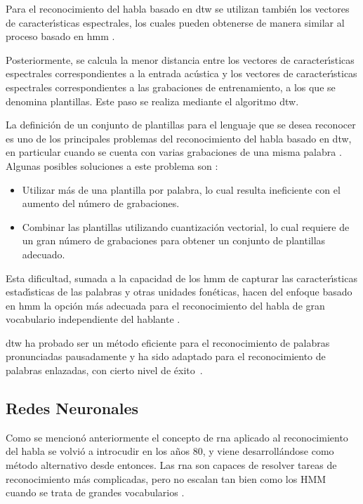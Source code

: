 Para el reconocimiento del habla basado en \gls{dtw} se utilizan tambi\'en los vectores de 
caracter{\'\i}sticas espectrales, los cuales pueden obtenerse de manera similar al proceso 
basado en \gls{hmm} \cite{Hachkar2011}.

Posteriormente, se calcula la menor distancia entre los vectores de caracter{\'\i}sticas 
espectrales correspondientes a la entrada ac\'ustica y los vectores de caracter{\'\i}sticas 
espectrales correspondientes a las grabaciones de entrenamiento, a los que se denomina plantillas. 
Este paso se realiza mediante el algoritmo \gls{dtw}.

La definici\'on de un conjunto de plantillas para el lenguaje que se desea reconocer es uno de
los principales problemas del reconocimiento del habla basado en \gls{dtw}, en particular cuando 
se cuenta con varias grabaciones de una misma palabra \cite{Abdulla2003}. 
Algunas posibles soluciones a este problema son \cite{Abdulla2003}:

\begin{itemize}
    \item Utilizar m\'as de una plantilla por palabra, lo cual resulta ineficiente con el aumento del
    n\'umero de grabaciones.
    \item Combinar las plantillas utilizando cuantizaci\'on vectorial, lo cual requiere de un gran
    n\'umero de grabaciones para obtener un conjunto de plantillas adecuado.
\end{itemize}

Esta dificultad, sumada a la capacidad de los \gls{hmm} de capturar las caracter{\'\i}sticas 
estad{\'\i}sticas de las palabras y otras unidades fon\'eticas, hacen del enfoque basado en \gls{hmm}
la opci\'on m\'as adecuada para el reconocimiento del habla de gran vocabulario independiente del 
hablante \cite{Wong1998}.

\gls{dtw} ha probado ser un m\'etodo eficiente para el reconocimiento de palabras pronunciadas 
pausadamente \cite{MyersALevel1981} y ha sido adaptado para el reconocimiento de palabras enlazadas,
con cierto nivel de \mbox{\'exito \cite{MyersALevel1981, SakoeTwoLevel1979, RabinerApplication1980}}.


\subsection{Redes Neuronales}
\label{sec:otrosModelosANN}

Como se mencion\'o anteriormente el concepto de \gls{rna} aplicado al reconocimiento
del habla se volvi\'o a introcudir en los a\~nos 80, y viene desarroll\'andose como m\'etodo 
alternativo desde entonces. Las \gls{rna} son capaces de resolver tareas de reconocimiento
m\'as complicadas, pero no escalan tan bien como los HMM cuando se trata de grandes 
vocabularios \cite{VimalaReview2012}.


